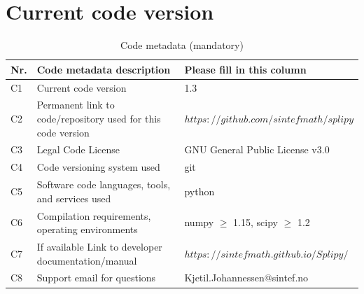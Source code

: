 \documentclass[preprint,12pt, a4paper]{elsarticle}
\begin{document}






\section*{Current code version}
\label{}


\begin{table}[!h]
\begin{tabular}{|l|p{5.5cm}|p{7.5cm}|}
\hline
\textbf{Nr.} & \textbf{Code metadata description} & \textbf{Please fill in this column} \\
\hline
C1 & Current code version & 1.3 \\
\hline
C2 & Permanent link to code/repository used for this code version & $https://github.com/sintefmath/splipy$ \\
\hline
C3 & Legal Code License   & GNU General Public License v3.0  \\
\hline
C4 & Code versioning system used & git \\
\hline
C5 & Software code languages, tools, and services used & python \\
\hline
C6 & Compilation requirements, operating environments & numpy $\geq$ 1.15, scipy $\geq$ 1.2 \\
\hline
C7 & If available Link to developer documentation/manual & $https://sintefmath.github.io/Splipy/$ \\
\hline
C8 & Support email for questions & Kjetil.Johannessen@sintef.no \\
\hline
\end{tabular}
\caption{Code metadata (mandatory)}
\label{}
\end{table}

%
%
\end{document}
